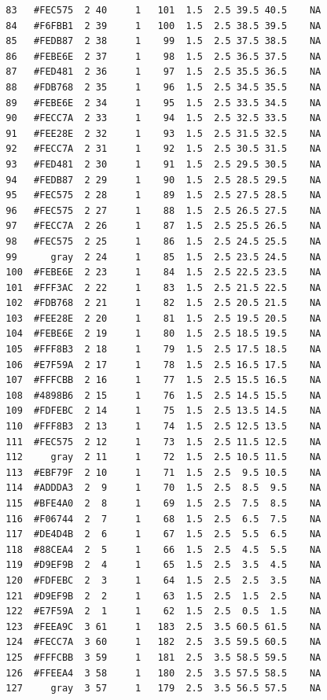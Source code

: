 \documentclass[12pt,twoside]{reedthesis}
\begin{document}
\begin{verbatim}
  83   #FEC575  2 40     1   101  1.5  2.5 39.5 40.5    NA
  84   #F6FBB1  2 39     1   100  1.5  2.5 38.5 39.5    NA
  85   #FEDB87  2 38     1    99  1.5  2.5 37.5 38.5    NA
  86   #FEBE6E  2 37     1    98  1.5  2.5 36.5 37.5    NA
  87   #FED481  2 36     1    97  1.5  2.5 35.5 36.5    NA
  88   #FDB768  2 35     1    96  1.5  2.5 34.5 35.5    NA
  89   #FEBE6E  2 34     1    95  1.5  2.5 33.5 34.5    NA
  90   #FECC7A  2 33     1    94  1.5  2.5 32.5 33.5    NA
  91   #FEE28E  2 32     1    93  1.5  2.5 31.5 32.5    NA
  92   #FECC7A  2 31     1    92  1.5  2.5 30.5 31.5    NA
  93   #FED481  2 30     1    91  1.5  2.5 29.5 30.5    NA
  94   #FEDB87  2 29     1    90  1.5  2.5 28.5 29.5    NA
  95   #FEC575  2 28     1    89  1.5  2.5 27.5 28.5    NA
  96   #FEC575  2 27     1    88  1.5  2.5 26.5 27.5    NA
  97   #FECC7A  2 26     1    87  1.5  2.5 25.5 26.5    NA
  98   #FEC575  2 25     1    86  1.5  2.5 24.5 25.5    NA
  99      gray  2 24     1    85  1.5  2.5 23.5 24.5    NA
  100  #FEBE6E  2 23     1    84  1.5  2.5 22.5 23.5    NA
  101  #FFF3AC  2 22     1    83  1.5  2.5 21.5 22.5    NA
  102  #FDB768  2 21     1    82  1.5  2.5 20.5 21.5    NA
  103  #FEE28E  2 20     1    81  1.5  2.5 19.5 20.5    NA
  104  #FEBE6E  2 19     1    80  1.5  2.5 18.5 19.5    NA
  105  #FFF8B3  2 18     1    79  1.5  2.5 17.5 18.5    NA
  106  #E7F59A  2 17     1    78  1.5  2.5 16.5 17.5    NA
  107  #FFFCBB  2 16     1    77  1.5  2.5 15.5 16.5    NA
  108  #4898B6  2 15     1    76  1.5  2.5 14.5 15.5    NA
  109  #FDFEBC  2 14     1    75  1.5  2.5 13.5 14.5    NA
  110  #FFF8B3  2 13     1    74  1.5  2.5 12.5 13.5    NA
  111  #FEC575  2 12     1    73  1.5  2.5 11.5 12.5    NA
  112     gray  2 11     1    72  1.5  2.5 10.5 11.5    NA
  113  #EBF79F  2 10     1    71  1.5  2.5  9.5 10.5    NA
  114  #ADDDA3  2  9     1    70  1.5  2.5  8.5  9.5    NA
  115  #BFE4A0  2  8     1    69  1.5  2.5  7.5  8.5    NA
  116  #F06744  2  7     1    68  1.5  2.5  6.5  7.5    NA
  117  #DE4D4B  2  6     1    67  1.5  2.5  5.5  6.5    NA
  118  #88CEA4  2  5     1    66  1.5  2.5  4.5  5.5    NA
  119  #D9EF9B  2  4     1    65  1.5  2.5  3.5  4.5    NA
  120  #FDFEBC  2  3     1    64  1.5  2.5  2.5  3.5    NA
  121  #D9EF9B  2  2     1    63  1.5  2.5  1.5  2.5    NA
  122  #E7F59A  2  1     1    62  1.5  2.5  0.5  1.5    NA
  123  #FEEA9C  3 61     1   183  2.5  3.5 60.5 61.5    NA
  124  #FECC7A  3 60     1   182  2.5  3.5 59.5 60.5    NA
  125  #FFFCBB  3 59     1   181  2.5  3.5 58.5 59.5    NA
  126  #FFEEA4  3 58     1   180  2.5  3.5 57.5 58.5    NA
  127     gray  3 57     1   179  2.5  3.5 56.5 57.5    NA

\end{verbatim}
\end{document}
